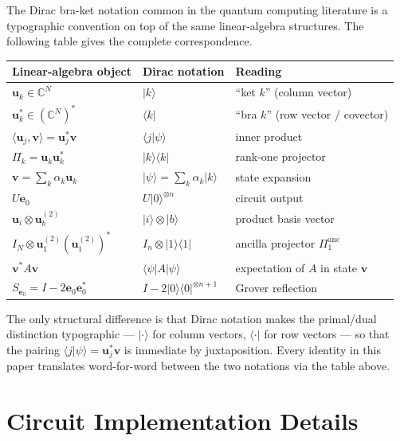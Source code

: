 \documentclass[12pt,a4paper]{article}
\theoremstyle{plain}
\theoremstyle{definition}
\theoremstyle{remark}
\newcommand{\bra}[1]{\langle#1\rvert}
\newcommand{\ket}[1]{\lvert#1\rangle}
\newcommand{\braket}[2]{\langle#1\vert#2\rangle}
\begin{document}
The Dirac bra-ket notation common in the quantum computing literature
is a typographic convention on top of the same linear-algebra structures.
The following table gives the complete correspondence.

\begin{center}
\renewcommand{\arraystretch}{1.5}
\begin{tabular}{lll}
\toprule
Linear-algebra object & Dirac notation & Reading \\
\midrule
$\mathbf{u}_k \in \mathbb{C}^N$ & $\ket{k}$ & ``ket $k$'' (column vector) \\
$\mathbf{u}_k^* \in (\mathbb{C}^N)^*$ & $\bra{k}$ & ``bra $k$'' (row vector / covector) \\
$\langle \mathbf{u}_j, \mathbf{v}\rangle = \mathbf{u}_j^*\mathbf{v}$ & $\braket{j}{\psi}$ & inner product \\
$\Pi_k = \mathbf{u}_k\mathbf{u}_k^*$ & $\ket{k}\bra{k}$ & rank-one projector \\
$\mathbf{v} = \sum_k\alpha_k\mathbf{u}_k$ & $\ket{\psi}=\sum_k\alpha_k\ket{k}$ & state expansion \\
$U\mathbf{e}_0$ & $U\ket{0}^{\otimes n}$ & circuit output \\
$\mathbf{u}_i\otimes\mathbf{u}_b^{(2)}$ & $\ket{i}\otimes\ket{b}$ & product basis vector \\
$I_N\otimes\mathbf{u}_1^{(2)}(\mathbf{u}_1^{(2)})^*$ & $I_n\otimes\ket{1}\bra{1}$ & ancilla projector $\Pi_1^{\mathrm{anc}}$ \\
$\mathbf{v}^*A\mathbf{v}$ & $\bra{\psi}A\ket{\psi}$ & expectation of $A$ in state $\mathbf{v}$ \\
$S_{\mathbf{e}_0} = I - 2\mathbf{e}_0\mathbf{e}_0^*$ & $I - 2\ket{0}\bra{0}^{\otimes n+1}$ & Grover reflection \\
\bottomrule
\end{tabular}
\end{center}

The only structural difference is that Dirac notation makes the
primal/dual distinction typographic — $\ket{\cdot}$ for column
vectors, $\bra{\cdot}$ for row vectors — so that the pairing
$\braket{j}{\psi} = \mathbf{u}_j^*\mathbf{v}$ is immediate by
juxtaposition.
Every identity in this paper translates word-for-word between the
two notations via the table above.



\section{Circuit Implementation Details}
\label{app:circuit_proof}
\end{document}
